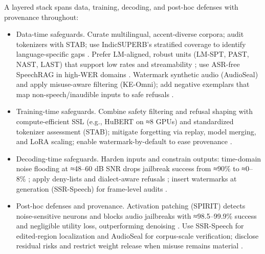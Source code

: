 \documentclass{article}
\begin{document}
A layered stack spans data, training, decoding, and post-hoc defenses with provenance throughout:
\begin{itemize}
\item Data-time safeguards. Curate multilingual, accent-diverse corpora; audit tokenizers with STAB; use IndicSUPERB’s stratified coverage to identify language-specific gaps \cite{vashishth2024stabspeechtokenizerassessmentbenchmark,entry2025indicsuperbspeechprocessinguniversalperf}. Prefer LM-aligned, robust units (LM-SPT, PAST, NAST, LAST) that support low rates and streamability \cite{jo2025lmsptalignedsemanticdistillationspeechto,har-tuv2025pastphoneticacousticspeechtokenizer,messica2024nastnoiseawarespeechtokenizationlanguage,turetzky2024lastlanguagemodelawarespeechtokenization}; use ASR-free SpeechRAG in high-WER domains \cite{min2025speechretrievalaugmentedgenerationwithou}. Watermark synthetic audio (AudioSeal) and apply misuse-aware filtering (KE-Omni); add negative exemplars that map non-speech/inaudible inputs to safe refusals \cite{zhao2024advancingspeechlanguagemodelsscalingsupe,dao2025ichigomixedmodalearlyfusionrealtimevoice}.
\item Training-time safeguards. Combine safety filtering and refusal shaping with compute-efficient SSL (e.g., HuBERT on ≈8 GPUs) and standardized tokenizer assessment (STAB); mitigate forgetting via replay, model merging, and LoRA scaling; enable watermark-by-default to ease provenance \cite{chen2023reducingbarriersselfsupervisedlearninghu,vashishth2024stabspeechtokenizerassessmentbenchmark,hsiao2025analyzingmitigationstrategiescatastrophi,wang2025ssrspeechtowardsstablesaferobustzeroshot,zhu2024generativepretrainedspeechlanguagemodele}.
\item Decoding-time safeguards. Harden inputs and constrain outputs: time-domain noise flooding at ≈48–60 dB SNR drops jailbreak success from ≈90\% to ≈0–8\% \cite{peri2024speechguardexploringadversarialrobustnes}; apply deny-lists and dialect-aware refusals \cite{dao2025ichigomixedmodalearlyfusionrealtimevoice}; insert watermarks at generation (SSR-Speech) for frame-level audits \cite{wang2025ssrspeechtowardsstablesaferobustzeroshot}.
\item Post-hoc defenses and provenance. Activation patching (SPIRIT) detects noise-sensitive neurons and blocks audio jailbreaks with ≈98.5–99.9\% success and negligible utility loss, outperforming denoising \cite{djanibekov2025spiritpatchingspeechlanguagemodelsagains}. Use SSR-Speech for edited-region localization and AudioSeal for corpus-scale verification; disclose residual risks and restrict weight release when misuse remains material \cite{wang2025ssrspeechtowardsstablesaferobustzeroshot,zhao2024advancingspeechlanguagemodelsscalingsupe,park2025longformspeechgenerationspokenlanguagemo}.
\end{itemize}
\end{document}
